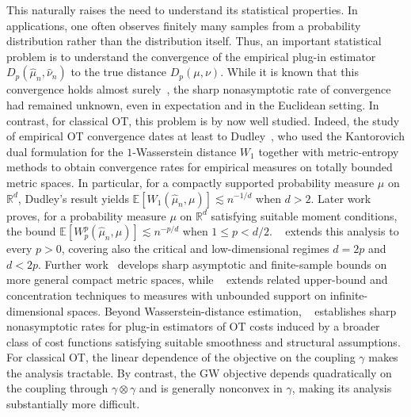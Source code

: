 \documentclass[11pt]{amsart}
\theoremstyle{definition}
\theoremstyle{remark}
\newcommand{\R}{\mathbb{R}}
\newcommand{\E}{\mathbb{E}}
\newcommand{\1}{\mathbf{1}}
\numberwithin{equation}{section}
\begin{document}
This naturally raises the need to understand its statistical properties. In applications, one often observes finitely many samples from a probability distribution rather than the distribution itself. Thus, an important statistical problem is to understand the convergence of the empirical plug-in estimator $D_{p}(\widehat\mu_n,\widehat\nu_n)$ to the true distance $D_{p}(\mu,\nu)$. While it is known that this convergence holds almost surely~\cite{memoli2011gromov}, the sharp nonasymptotic rate of convergence had remained unknown, even in expectation and in the Euclidean setting. In contrast, for classical OT, this problem is by now well studied. Indeed, the study of empirical OT convergence dates at least to Dudley~\cite{dudley1969speed}, who used the Kantorovich dual formulation for the $1$-Wasserstein distance $W_1$ together with metric-entropy methods to obtain convergence rates for empirical measures on totally bounded metric spaces. In particular, for a compactly supported probability measure $\mu$ on $\R^d$, Dudley's result yields
$\E[W_1(\widehat\mu_n,\mu)]\lesssim n^{-1/d}$
when $d>2$. Later work~\cite{dereich2013constructive} proves, for a probability measure $\mu$ on $\R^d$ satisfying suitable moment conditions, the bound
$\E[W_p^p(\widehat\mu_n,\mu)]\lesssim n^{-p/d}$
when $1\leq p<d/2$. ~\cite{fournier2015rate} extends this analysis to every $p>0$, covering also the critical and low-dimensional regimes $d=2p$ and $d<2p$. Further work~\cite{weed2019sharp} develops sharp asymptotic and finite-sample bounds on more general compact metric spaces, while ~\cite{lei2020convergence} extends related upper-bound and concentration techniques to measures with unbounded support on infinite-dimensional spaces. Beyond Wasserstein-distance estimation, ~\cite{manole2024sharp} establishes sharp nonasymptotic rates for plug-in estimators of OT costs induced by a broader class of cost functions satisfying suitable smoothness and structural assumptions. For classical OT, the linear dependence of the objective on the coupling $\gamma$ makes the analysis tractable. By contrast, the GW objective depends quadratically on the coupling through $\gamma\otimes\gamma$ and is generally nonconvex in $\gamma$, making its analysis substantially more difficult.
\end{document}
